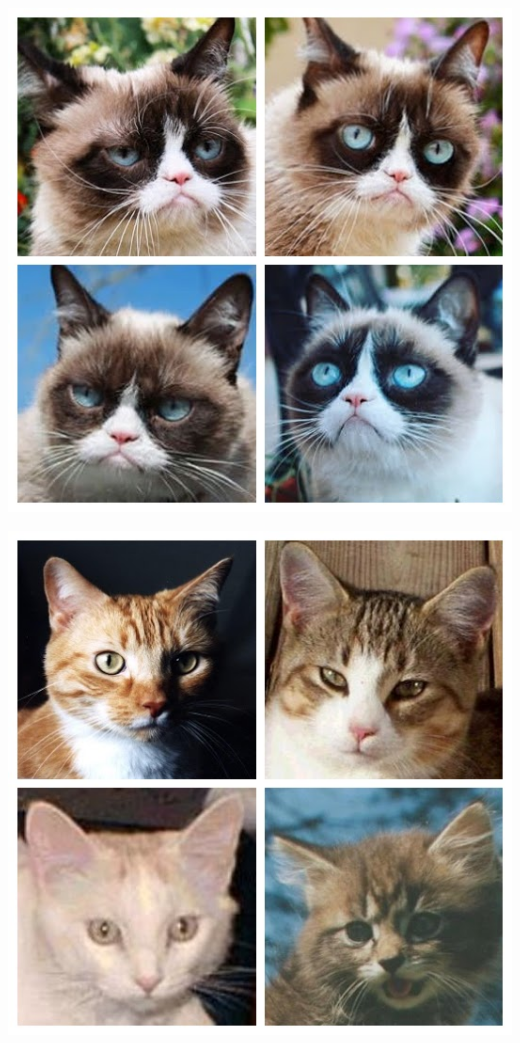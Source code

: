 \documentclass[12pt]{article}
\begin{document}
\begin{minipage}[t]{0.2\textwidth} 
	\includegraphics[width=1\textwidth]{Images/grumpy.jpg}
\end{minipage}
\begin{minipage}[t]{0.2\textwidth} 
	\includegraphics[width=1\textwidth]{Images/cat.jpg}
\end{minipage}
\end{document}
